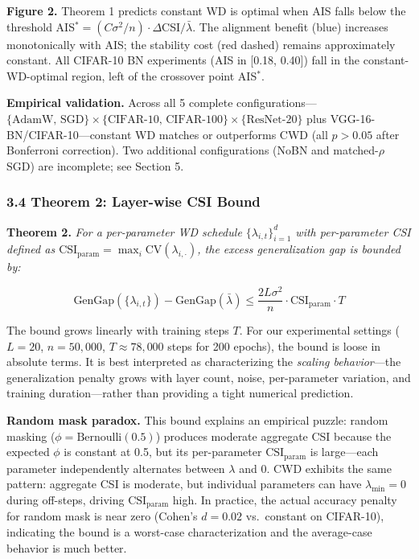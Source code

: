 \documentclass[
]{article}
\begin{document}
\textbf{Figure 2.} Theorem 1 predicts constant WD is optimal when AIS
falls below the threshold
AIS\(^* = (C\sigma^2/n) \cdot \Delta\)CSI\(/\bar{\lambda}\). The
alignment benefit (blue) increases monotonically with AIS; the stability
cost (red dashed) remains approximately constant. All CIFAR-10 BN
experiments (AIS in {[}0.18, 0.40{]}) fall in the constant-WD-optimal
region, left of the crossover point AIS\(^*\).

\textbf{Empirical validation.} Across all 5 complete
configurations---\(\{\text{AdamW, SGD}\} \times \{\text{CIFAR-10, CIFAR-100}\} \times \{\text{ResNet-20}\}\)
plus VGG-16-BN/CIFAR-10---constant WD matches or outperforms CWD (all
\(p > 0.05\) after Bonferroni correction). Two additional configurations
(NoBN and matched-\(\rho\) SGD) are incomplete; see Section 5.

\hypertarget{theorem-2-layer-wise-csi-bound}{%
\subsubsection{3.4 Theorem 2: Layer-wise CSI
Bound}\label{theorem-2-layer-wise-csi-bound}}

\textbf{Theorem 2.} \emph{For a per-parameter WD schedule
\(\{\lambda_{i,t}\}_{i=1}^d\) with per-parameter CSI defined as
\(\text{CSI}_\text{param} = \max_i \text{CV}(\lambda_{i,\cdot})\), the
excess generalization gap is bounded by:}

\[\text{GenGap}(\{\lambda_{i,t}\}) - \text{GenGap}(\bar{\lambda}) \leq \frac{2L\sigma^2}{n} \cdot \text{CSI}_\text{param} \cdot T\]

The bound grows linearly with training steps \(T\). For our experimental
settings (\(L = 20\), \(n = 50{,}000\), \(T \approx 78{,}000\) steps for
200 epochs), the bound is loose in absolute terms. It is best
interpreted as characterizing the \emph{scaling behavior}---the
generalization penalty grows with layer count, noise, per-parameter
variation, and training duration---rather than providing a tight
numerical prediction.

\textbf{Random mask paradox.} This bound explains an empirical puzzle:
random masking (\(\phi = \text{Bernoulli}(0.5)\)) produces moderate
aggregate CSI because the expected \(\phi\) is constant at 0.5, but its
per-parameter \(\text{CSI}_\text{param}\) is large---each parameter
independently alternates between \(\lambda\) and 0. CWD exhibits the
same pattern: aggregate CSI is moderate, but individual parameters can
have \(\lambda_{\min} = 0\) during off-steps, driving
\(\text{CSI}_\text{param}\) high. In practice, the actual accuracy
penalty for random mask is near zero (Cohen's \(d = 0.02\) vs.~constant
on CIFAR-10), indicating the bound is a worst-case characterization and
the average-case behavior is much better.
\end{document}
